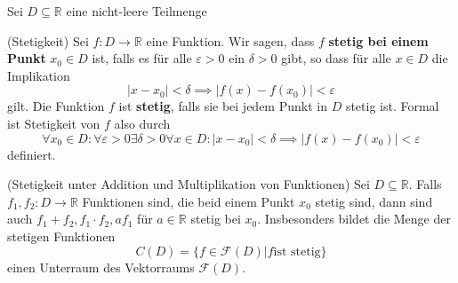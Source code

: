 \documentclass[../Analysis1_script.tex]{subfiles}
\begin{document}
Sei $D \subseteq \mathbb{R}$ eine nicht-leere Teilmenge
\begin{definition}{(Stetigkeit)}
	Sei $f: D \to \mathbb{R}$ eine Funktion. Wir sagen, dass $f$ \textbf{stetig bei einem Punkt} $x_0 \in D$ ist, falls es für alle $\varepsilon > 0$ ein $\delta > 0$ gibt, so dass für alle $x \in D$ die Implikation 
	\[|x - x_0| < \delta \implies |f(x) - f(x_0)| < \varepsilon\]
	gilt. Die Funktion $f$ ist \textbf{stetig}, falls sie bei jedem Punkt in $D$ stetig ist. Formal ist Stetigkeit von $f$ also durch
	\[\forall x_0 \in D: \forall \varepsilon > 0 \exists \delta > 0 \forall x \in D: |x - x_0| < \delta \implies |f(x) - f(x_0)| < \varepsilon\]
	definiert.  
\end{definition}

\begin{proposition}{(Stetigkeit unter Addition und Multiplikation von Funktionen)}
	Sei $D \subseteq \mathbb{R}$. Falls $f_1, f_2: D \to \mathbb{R}$ Funktionen sind, die beid einem Punkt $x_0$ stetig sind, dann sind auch $f_1 + f_2, f_1 \cdot f_2, af_1$ für $a \in \mathbb{R}$ stetig bei $x_0$. Insbesonders bildet die Menge der stetigen Funktionen 
	\[C(D) = \{f \in \mathcal{F}(D) | f \text{ist stetig}\}\]
	einen Unterraum des Vektorraums $\mathcal{F}(D)$.
\end{proposition}
\end{document}
